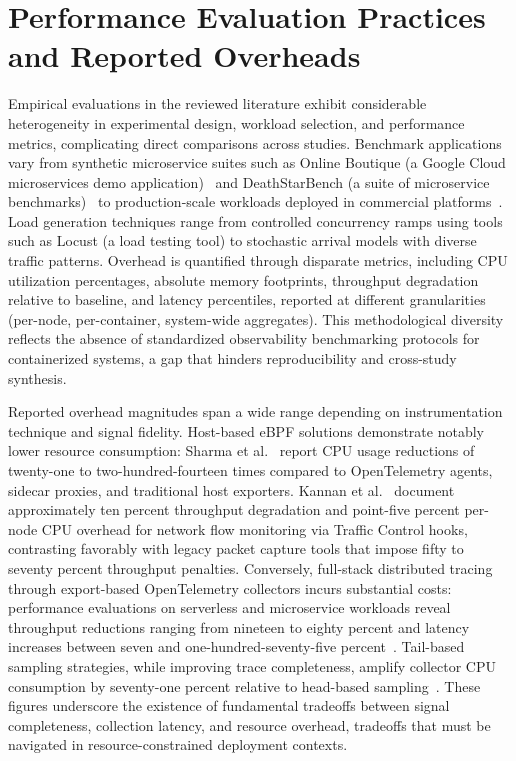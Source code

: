 \section{Performance Evaluation Practices and Reported Overheads}
\label{sec:evaluation-practices}

Empirical evaluations in the reviewed literature exhibit considerable heterogeneity in experimental design, workload selection, and performance metrics, complicating direct comparisons across studies. Benchmark applications vary from synthetic microservice suites such as Online Boutique (a Google Cloud microservices demo application)~\cite{hasanthEvaluatingPerformanceSidecarbased2024} and DeathStarBench (a suite of microservice benchmarks)~\cite{TraceWeaverDistributedRequest} to production-scale workloads deployed in commercial platforms~\cite{liuJCallGraphTracingMicroservices2019}. Load generation techniques range from controlled concurrency ramps using tools such as Locust (a load testing tool) to stochastic arrival models with diverse traffic patterns. Overhead is quantified through disparate metrics, including CPU utilization percentages, absolute memory footprints, throughput degradation relative to baseline, and latency percentiles, reported at different granularities (per-node, per-container, system-wide aggregates). This methodological diversity reflects the absence of standardized observability benchmarking protocols for containerized systems, a gap that hinders reproducibility and cross-study synthesis.

Reported overhead magnitudes span a wide range depending on instrumentation technique and signal fidelity. Host-based \gls{eBPF} solutions demonstrate notably lower resource consumption: Sharma et al.~\cite{sharmaEBPFEnhancedCompleteObservability2024} report CPU usage reductions of twenty-one to two-hundred-fourteen times compared to \gls{OpenTelemetry} agents, sidecar proxies, and traditional host exporters. Kannan et al.~\cite{kannanDesigningLightweightNetwork2024} document approximately ten percent throughput degradation and point-five percent per-node CPU overhead for network flow monitoring via Traffic Control hooks, contrasting favorably with legacy packet capture tools that impose fifty to seventy percent throughput penalties. Conversely, full-stack distributed tracing through export-based \gls{OpenTelemetry} collectors incurs substantial costs: performance evaluations on serverless and microservice workloads reveal throughput reductions ranging from nineteen to eighty percent and latency increases between seven and one-hundred-seventy-five percent~\cite{InvestigatingPerformanceOverhead}. Tail-based sampling strategies, while improving trace completeness, amplify collector CPU consumption by seventy-one percent relative to head-based sampling~\cite{karkanPerformanceOverheadOpenTelemetry}. These figures underscore the existence of fundamental tradeoffs between signal completeness, collection latency, and resource overhead, tradeoffs that must be navigated in resource-constrained deployment contexts.

